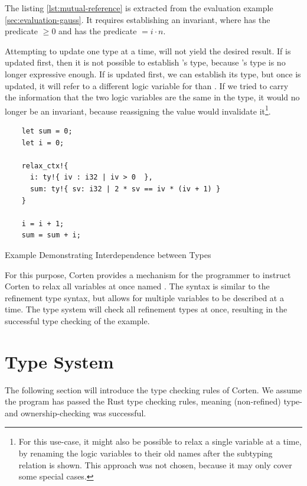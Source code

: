 \documentclass[twoside, english]{sdqthesis}
\theoremstyle{definition}
\begin{document}
The listing \ref{lst:mutual-reference} is extracted from the evaluation example \ref{sec:evaluation-gauss}. It requires establishing an invariant, where  has the predicate $\geq 0$ and  has the predicate $= i \cdot n$.

Attempting to update one type at a time, will not yield the desired result. If  is updated first, then it is not possible to establish 's type, because 's type is no longer expressive enough.
If  is updated first, we can establish its type, but once  is updated, it will refer to a different logic variable for  than . If we tried to carry the information that the two logic variables are the same in the type, it would no longer be an invariant, because reassigning the value would invalidate it\footnote{
  For this use-case, it might also be possible to relax a single variable at a time, by renaming the logic variables to their old names after the subtyping relation is shown. This approach was not chosen, because it may only cover some special cases.
}.

\begin{listing}[ht]
  \begin{verbatim}
    let sum = 0;
    let i = 0;
    
    relax_ctx!{
      i: ty!{ iv : i32 | iv > 0  },
      sum: ty!{ sv: i32 | 2 * sv == iv * (iv + 1) }
    }

    i = i + 1;
    sum = sum + i;
  \end{verbatim}
  \caption{Example Demonstrating Interdependence between Types}
  \label{lst:mutual-reference}
\end{listing}

For this purpose, Corten provides a mechanism for the programmer to instruct Corten to relax all variables at once \- named . The syntax is similar to the refinement type syntax, but allows for multiple variables to be described at a time. The type system will check all refinement types at once, resulting in the successful type checking of the example.

\section{Type System} \label{sec:type-system}

The following section will introduce the type checking rules of Corten. We assume the program has passed the Rust type checking rules, meaning (non-refined) type- and ownership-checking was successful.
\end{document}

